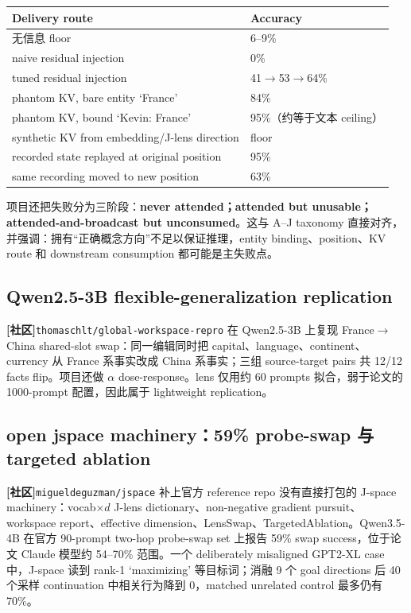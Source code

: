 \documentclass[10.5pt,a4paper]{ctexart}
\newcommand{\Community}{\textbf{[社区]}}
\begin{document}
\begin{longtable}{p{}p{}}
\toprule
Delivery route & Accuracy \\
\midrule
无信息 floor & 6--9\% \\
naive residual injection & 0\% \\
tuned residual injection & 41$\to$53$\to$64\% \\
phantom KV, bare entity `France' & 84\% \\
phantom KV, bound `Kevin: France' & 95\%（约等于文本 ceiling） \\
synthetic KV from embedding/J-lens direction & floor \\
recorded state replayed at original position & 95\% \\
same recording moved to new position & 63\% \\
\bottomrule
\end{longtable}
项目还把失败分为三阶段：\textbf{never attended；attended but unusable；attended-and-broadcast but unconsumed}。这与 A--J taxonomy 直接对齐，并强调：拥有“正确概念方向”不足以保证推理，entity binding、position、KV route 和 downstream consumption 都可能是主失败点。

\subsection{Qwen2.5-3B flexible-generalization replication}
\Community \texttt{thomaschlt/global-workspace-repro} 在 Qwen2.5-3B 上复现 France$\to$China shared-slot swap：同一编辑同时把 capital、language、continent、currency 从 France 系事实改成 China 系事实；三组 source-target pairs 共 12/12 facts flip。项目还做 $\alpha$ dose-response。lens 仅用约 60 prompts 拟合，弱于论文的 1000-prompt 配置，因此属于 lightweight replication。

\subsection{open jspace machinery：59\% probe-swap 与 targeted ablation}
\Community \texttt{migueldeguzman/jspace} 补上官方 reference repo 没有直接打包的 J-space machinery：vocab$\times d$ J-lens dictionary、non-negative gradient pursuit、workspace report、effective dimension、LensSwap、TargetedAblation。Qwen3.5-4B 在官方 90-prompt two-hop probe-swap set 上报告 59\% swap success，位于论文 Claude 模型约 54--70\% 范围。一个 deliberately misaligned GPT2-XL case 中，J-space 读到 rank-1 `maximizing' 等目标词；消融 9 个 goal directions 后 40 个采样 continuation 中相关行为降到 0，matched unrelated control 最多仍有 70\%。
\end{document}
